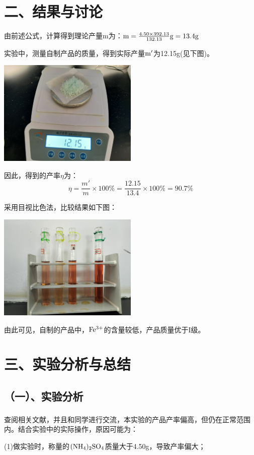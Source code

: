 \documentclass[a4paper,12pt]{article}
\begin{document}
\section*{二、结果与讨论}

由前述公式，计算得到理论产量m为：$\rm m=\frac{4.50\times 392.13}{132.13}g=13.4g$

实验中，测量自制产品的质量，得到实际产量$\rm m'$为12.15g(见下图)。

\medskip
\includegraphics[width=0.5\textwidth]{weight}

因此，得到的产率$\eta$为：
$$
\eta = \frac{m'}{m}\times 100\%=\frac{12.15}{13.4}\times 100\%=90.7\%
$$

采用目视比色法，比较结果如下图：

\medskip
\includegraphics[width=0.5\textwidth]{color}

由此可见，自制的产品中，$\rm Fe^{3+}$的含量较低，产品质量优于I级。

\section*{三、实验分析与总结}
\subsection*{（一）、实验分析}

查阅相关文献\textsuperscript{\cite{GZHA202401061}}，并且和同学进行交流，本实验的产品产率偏高，但仍在正常范围内。结合实验中的实际操作，原因可能为：

(1)做实验时，称量的$\rm (NH_4)_2SO_4$质量大于4.50g，导致产率偏大；
\end{document}
